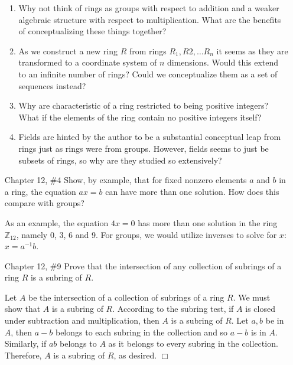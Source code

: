 \documentclass{article}
\newcommand{\Z}{\mathbb Z}
\begin{document}
\begin{enumerate}
    \begin{enumerate}
        \item Why not think of rings as groups with respect to addition and a weaker algebraic structure with respect to multiplication. What are the benefits of conceptualizing these things together?
        \item As we construct a new ring $R$ from rings $R_1, R2, \ldots R_n$ it seems as they are transformed to a coordinate system of $n$ dimensions. Would this extend to an infinite number of rings? Could we conceptualize them as a set of sequences instead?
        \item Why are characteristic of a ring restricted to being positive integers? What if the elements of the ring contain no positive integers itself?
        \item Fields are hinted by the author to be a substantial conceptual leap from rings just as rings were from groups. However, fields seems to just be subsets of rings, so why are they studied so extensively?
    \end{enumerate}
    
    \item[Chapter 12, \#4] Show, by example, that for fixed nonzero elements $a$ and $b$ in a ring, the equation $ax=b$ can have more than one solution. How does this compare with groups?
    
    \begin{flushleft}
    As an example, the equation $4x=0$ has more than one solution in the ring $\Z_{12}$, namely 0, 3, 6 and 9. For groups, we would utilize inverses to solve for $x$: $x = a^{-1}b$.
    \end{flushleft}
    
    \item[Chapter 12, \#9] Prove that the intersection of any collection of subrings of a ring $R$ is a subring of $R$.
    
    \begin{flushleft}
    Let $A$ be the intersection of a collection of subrings of a ring $R$. We must show that $A$ is a subring of $R$. According to the subring test, if $A$ is closed under subtraction and multiplication, then $A$ is a subring of $R$. Let $a, b $ be in $ A$, then $a-b$ belongs to each subring in the collection and so $a-b $ is in $ A$. Similarly, if $ab$ belongs to $A$ as it belongs to every subring in the collection. Therefore, $A$ is a subring of $R$, as desired. $\Box$\newline
    \end{flushleft}
    

\end{enumerate}
\end{document}
